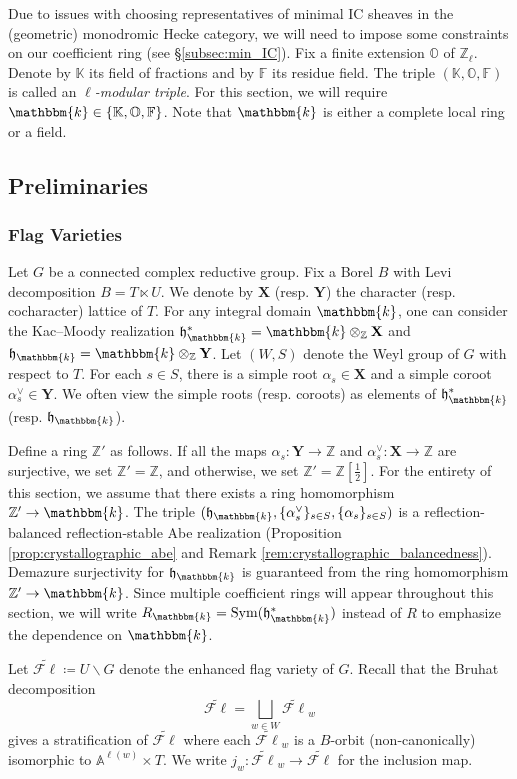 \documentclass{amsart}
\newcommand{\Z}{\mathbb{Z}}
\newcommand{\F}{\mathbb{F}}
\renewcommand{\O}{\mathbb{O}}
\newcommand{\K}{\mathbb{K}}
\newcommand{\A}{\mathbb{A}}
\renewcommand{\k}{\mathbbm{k}}
\newcommand{\bfX}{\mathbf{X}}
\newcommand{\bfY}{\mathbf{Y}}
\DeclareMathOperator{\Sym}{Sym}
\newcommand{\fr}[1]{\mathfrak{#1}}
\newcommand{\eFl}{\widetilde{\mathcal{F}\ell}}
\theoremstyle{definition}
\numberwithin{equation}{subsection}
\begin{document}
Due to issues with choosing representatives of minimal IC sheaves in the (geometric) monodromic Hecke category, we will need to impose some constraints on our coefficient ring (see \S\ref{subsec:min_IC}).
Fix a finite extension $\O$ of $\Z_{\ell}$. Denote by $\K$ its field of fractions and by $\F$ its residue field.
The triple $(\K, \O, \F)$ is called an \emph{$\ell$-modular triple}. For this section, we will require $\k \in \{ \K, \O, \F\}$.
Note that $\k$ is either a complete local ring or a field.

\subsection{Preliminaries}

\subsubsection{Flag Varieties}

Let $G$ be a connected complex reductive group. Fix a Borel $B$ with Levi decomposition $B = T \ltimes U$.
We denote by $\bfX$ (resp. $\bfY$) the character (resp. cocharacter) lattice of $T$.
For any integral domain $\k$, one can consider the Kac--Moody realization $\fr{h}_{\k}^* = \k \otimes_{\Z} \bfX$ and $\fr{h}_{\k} = \k \otimes_{\Z} \bfY$.
Let $(W,S)$ denote the Weyl group of $G$ with respect to $T$. 
For each $s \in S$, there is a simple root $\alpha_s \in \bfX$ and a simple coroot $\alpha^{\vee}_s \in \bfY$.
We often view the simple roots (resp. coroots) as elements of $\fr{h}_{\k}^*$ (resp. $\fr{h}_{\k}$). 

Define a ring $\Z'$ as follows.
If all the maps $\alpha_s : \bfY \to \Z$ and $\alpha_s^{\vee} : \bfX \to \Z$ are surjective, we set $\Z' = \Z$, and otherwise, we set $\Z' = \Z [\frac{1}{2}]$.
For the entirety of this section, we assume that there exists a ring homomorphism $\Z' \to \k$.
The triple $(\fr{h}_{\k}, \{ \alpha_s^{\vee}\}_{s \in S}, \{\alpha_s\}_{s \in S})$ is a reflection-balanced reflection-stable Abe realization (Proposition \ref{prop:crystallographic_abe} and Remark \ref{rem:crystallographic_balancedness}).
Demazure surjectivity for $\fr{h}_{\k}$ is guaranteed from the ring homomorphism $\Z' \to \k$.
Since multiple coefficient rings will appear throughout this section, we will write $R_{\k} = \Sym (\fr{h}_{\k}^*)$ instead of $R$ to emphasize the dependence on $\k$.

Let $\eFl \coloneq U \backslash G$ denote the enhanced flag variety of $G$. Recall that the Bruhat decomposition
\[\eFl = \bigsqcup_{w \in W} \eFl_w\]
gives a stratification of $\eFl$
where each $\eFl_w$ is a $B$-orbit (non-canonically) isomorphic to $\A^{\ell (w)} \times T$.
We write $j_w : \eFl_w \to \eFl$ for the inclusion map.
\end{document}
